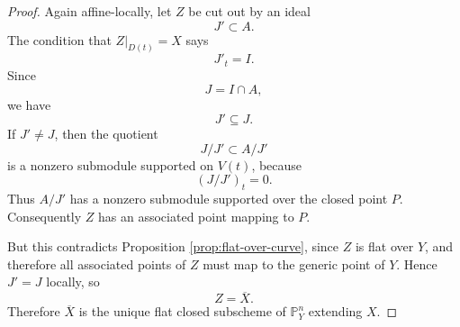 \documentclass[12pt]{article}
\begin{document}
\begin{proof}
    Again affine-locally, let $Z$ be cut out by an ideal
    \[
        J'\subset A.
    \]
    The condition that $Z|_{D(t)}=X$ says
    \[
        J'_t=I.
    \]
    Since
    \[
        J=I\cap A,
    \]
    we have
    \[
        J'\subseteq J.
    \]
    If $J'\neq J$, then the quotient
    \[
        J/J'\subset A/J'
    \]
    is a nonzero submodule supported on $V(t)$, because
    \[
        (J/J')_t=0.
    \]
    Thus $A/J'$ has a nonzero submodule supported over the closed point $P$. Consequently $Z$ has an associated point mapping to $P$.

    But this contradicts Proposition \ref{prop:flat-over-curve}, since $Z$ is flat over $Y$, and therefore all associated points of $Z$ must map to the generic point of $Y$. Hence $J'=J$ locally, so
    \[
        Z=\overline X.
    \]
    Therefore $\overline X$ is the unique flat closed subscheme of $\mathbb P^n_Y$ extending $X$.
\end{proof}
\end{document}
